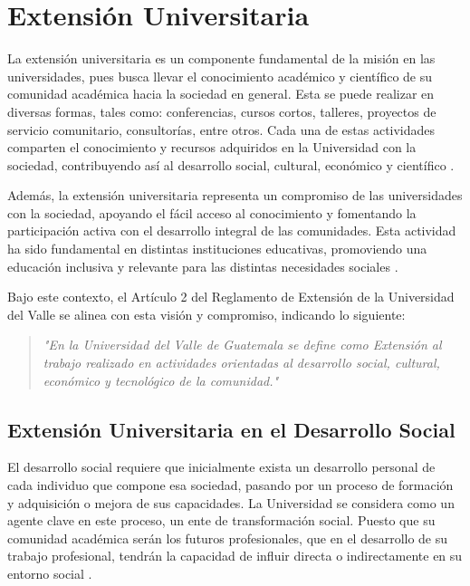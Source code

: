 \section{Extensión Universitaria}
La extensión universitaria es un componente fundamental de la misión en las universidades, pues busca llevar
el conocimiento académico y científico de su comunidad académica hacia la sociedad en general. 
Esta se puede realizar en diversas formas, tales como: conferencias, cursos cortos, talleres, proyectos de servicio 
comunitario, consultorías, entre otros. Cada una de estas actividades comparten el conocimiento y recursos adquiridos
en la Universidad con la sociedad, contribuyendo así al desarrollo social, cultural, económico y científico
\cite{bastias2004extension}. 

Además, la extensión universitaria representa un compromiso de las universidades con la sociedad, apoyando el fácil
acceso al conocimiento y fomentando la participación activa con el desarrollo integral de las comunidades. Esta actividad
ha sido fundamental en distintas instituciones educativas, promoviendo una educación inclusiva y relevante para las 
distintas necesidades sociales \cite{colotta2019politicasUniversitarias}.

Bajo este contexto, el Artículo 2 del Reglamento de Extensión de la Universidad del Valle se alinea con esta 
visión y compromiso, indicando lo siguiente: 
\begin{quote}
    \textit{"En la Universidad del Valle de Guatemala se define como Extensión al trabajo
    realizado en actividades orientadas al desarrollo social, cultural, económico y tecnológico de
    la comunidad."}
    \cite{reglamento2022uvg}
\end{quote}

    \subsection{Extensión Universitaria en el Desarrollo Social}
    El desarrollo social requiere que inicialmente exista un desarrollo personal de cada individuo
    que compone esa sociedad, pasando por un proceso de formación y adquisición o mejora de sus capacidades.
    La Universidad se considera como un agente clave en este proceso, un ente de transformación social. 
    Puesto que su comunidad académica serán los futuros profesionales, que en el desarrollo de su trabajo profesional,
    tendrán la capacidad de influir directa o indirectamente en su entorno social 
    \cite{loor2022universidadSociedad,cedeña2012extensionDesarrollo}.

